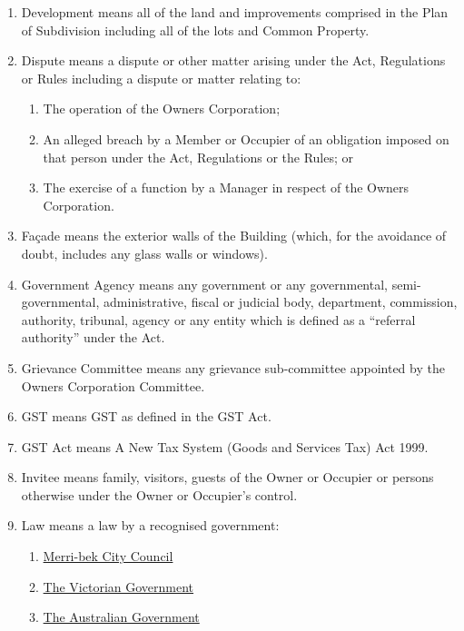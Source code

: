 \documentclass{article}
\begin{document}
\begin{enumerate}[label=\arabic*.]
\begin{enumerate}[label=\arabic{enumi}.\arabic*.]
\begin{enumerate}[label=\arabic{enumi}.\arabic*.]
\begin{enumerate}[label=(\arabic*)]
\item  Development means all of the land and improvements comprised in the Plan of Subdivision including all of the lots and Common Property.

\item  Dispute means a dispute or other matter arising under the Act, Regulations or Rules including a dispute or matter relating to:

\begin{enumerate}[label=(\alph*)]

\item  The operation of the Owners Corporation;

\item  An alleged breach by a Member or Occupier of an obligation imposed on that person under the Act, Regulations or the Rules; or

\item  The exercise of a function by a Manager in respect of the Owners Corporation.

\end{enumerate}

\item  Façade means the exterior walls of the Building (which, for the avoidance of doubt, includes any glass walls or windows).

\item  Government Agency means any government or any governmental, semi-governmental, administrative, fiscal or judicial body, department, commission, authority, tribunal, agency or any entity which is defined as a “referral authority” under the Act.

\item  Grievance Committee means any grievance sub-committee appointed by the Owners Corporation Committee.

\item  GST means GST as defined in the GST Act.

\item  GST Act means A New Tax System (Goods and Services Tax) Act 1999.

\item  Invitee means family, visitors, guests of the Owner or Occupier or persons otherwise under the Owner or Occupier’s control.

\item Law means a law by a recognised government:
\begin{enumerate}
    \item \href{https://www.merri-bek.vic.gov.au/}{Merri-bek City Council}
    \item \href{https://www.vic.gov.au/}{The Victorian Government}
    \item \href{https://my.gov.au/}{The Australian Government}
\end{enumerate}


\end{enumerate}
\end{enumerate}
\end{enumerate}
\end{enumerate}
\end{document}
